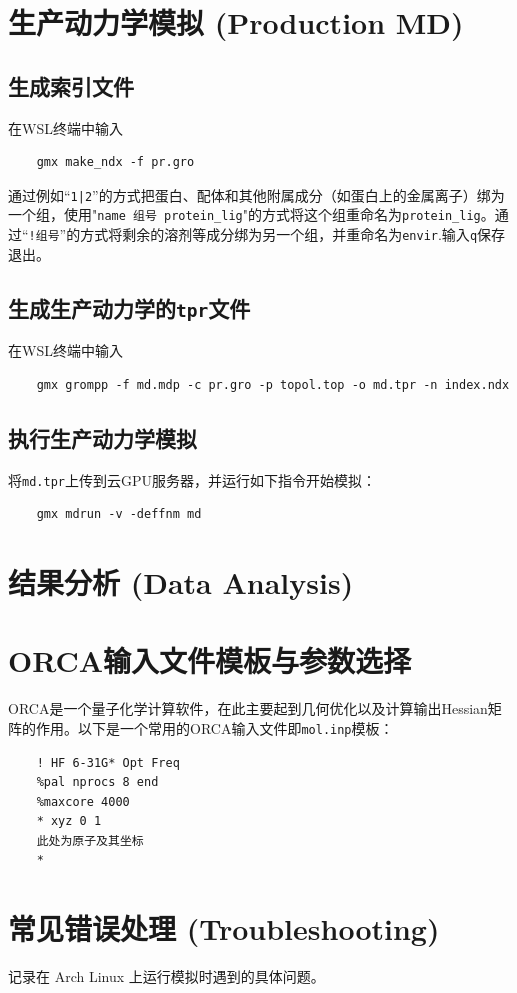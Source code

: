 \documentclass[UTF8, a4paper, 11pt]{ctexart}
\begin{document}
	\section{生产动力学模拟 (Production MD)}
	\subsection{生成索引文件}
	在WSL终端中输入
	\begin{lstlisting}
	gmx make_ndx -f pr.gro
	\end{lstlisting}
	
	通过例如“\texttt{1|2}”的方式把蛋白、配体和其他附属成分（如蛋白上的金属离子）绑为一个组，使用"\texttt{name 组号 protein\_lig}"的方式将这个组重命名为\texttt{protein\_lig}。通过“\texttt{!组号}”的方式将剩余的溶剂等成分绑为另一个组，并重命名为\texttt{envir}.输入\texttt{q}保存退出。
	\subsection{生成生产动力学的\texttt{tpr}文件}
	在WSL终端中输入
	\begin{lstlisting}
	gmx grompp -f md.mdp -c pr.gro -p topol.top -o md.tpr -n index.ndx
	\end{lstlisting}
	\subsection{执行生产动力学模拟}
	将\texttt{md.tpr}上传到云GPU服务器，并运行如下指令开始模拟：
	\begin{lstlisting}
	gmx mdrun -v -deffnm md
	\end{lstlisting}
	\section{结果分析 (Data Analysis)}
	
	\newpage
	
	\begin{appendices}
		\section{ORCA输入文件模板与参数选择}
		\label{sec:orca temple}
		ORCA是一个量子化学计算软件，在此主要起到几何优化以及计算输出Hessian矩阵的作用。以下是一个常用的ORCA输入文件即\texttt{mol.inp}模板：
	\begin{lstlisting}
	! HF 6-31G* Opt Freq
	%pal nprocs 8 end
	%maxcore 4000
	* xyz 0 1
	此处为原子及其坐标
	*
	\end{lstlisting}
		\section{常见错误处理 (Troubleshooting)}
		记录在 Arch Linux 上运行模拟时遇到的具体问题。
	\end{appendices}
	
\end{document}
